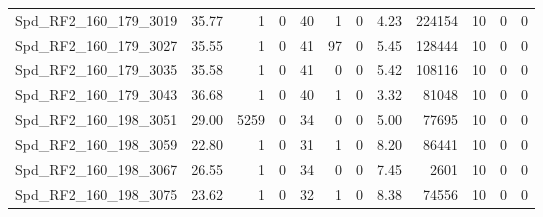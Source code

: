 \begin{longtable}[c]{@{}lrrrrrrrrrrr@{}}
Spd\_RF2\_160\_179\_3019     & 35.77                  & 1                       & 0                       & 40                     & 1                       & 0                       & 4.23                    & 224154                   & 10                       & 0                        & 0                        \\
Spd\_RF2\_160\_179\_3027     & 35.55                  & 1                       & 0                       & 41                     & 97                      & 0                       & 5.45                    & 128444                   & 10                       & 0                        & 0                        \\
Spd\_RF2\_160\_179\_3035     & 35.58                  & 1                       & 0                       & 41                     & 0                       & 0                       & 5.42                    & 108116                   & 10                       & 0                        & 0                        \\
Spd\_RF2\_160\_179\_3043     & 36.68                  & 1                       & 0                       & 40                     & 1                       & 0                       & 3.32                    & 81048                    & 10                       & 0                        & 0                        \\
Spd\_RF2\_160\_198\_3051     & 29.00                  & 5259                    & 0                       & 34                     & 0                       & 0                       & 5.00                    & 77695                    & 10                       & 0                        & 0                        \\
Spd\_RF2\_160\_198\_3059     & 22.80                  & 1                       & 0                       & 31                     & 1                       & 0                       & 8.20                    & 86441                    & 10                       & 0                        & 0                        \\
Spd\_RF2\_160\_198\_3067     & 26.55                  & 1                       & 0                       & 34                     & 0                       & 0                       & 7.45                    & 2601                     & 10                       & 0                        & 0                        \\
Spd\_RF2\_160\_198\_3075     & 23.62                  & 1                       & 0                       & 32                     & 1                       & 0                       & 8.38                    & 74556                    & 10                       & 0                        & 0                        \\

\end{longtable}
